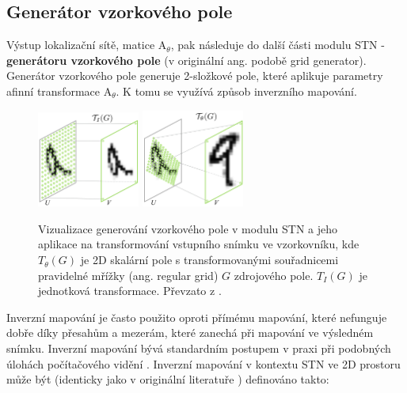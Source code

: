 \subsection{Generátor vzorkového pole}

Výstup lokalizační sítě, matice ${\displaystyle \mathrm {A} }_\theta$, pak následuje do další části modulu STN - \textbf{generátoru vzorkového pole} (v originální ang. podobě grid generator). Generátor vzorkového pole generuje 2-složkové pole, které aplikuje parametry afinní transformace ${\displaystyle \mathrm {A} }_\theta$. K tomu se využívá způsob inverzního mapování.

\begin{figure}[h]
\centering
\includegraphics[width=0.3\textwidth,keepaspectratio]{Figures/stn/stn_a.png}
\includegraphics[width=0.3\textwidth,keepaspectratio]{Figures/stn/stn_b.png}
\caption[Vizualizace generování vzorkového pole v modulu STN]
{Vizualizace generování vzorkového pole v modulu STN a jeho aplikace na transformování vstupního snímku ve vzorkovníku, kde $T_{\theta}(G)$ je 2D skalární pole s transformovanými souřadnicemi pravidelné mřížky (ang. regular grid) $G$ zdrojového pole. $T_{I}(G)$ je jednotková transformace. Převzato z \cite{stn}. }
\label{fig:stn_grid}
\end{figure}

Inverzní mapování je často použito oproti přímému mapování, které nefunguje dobře díky přesahům a mezerám, které zanechá při mapování ve výsledném snímku. Inverzní mapování bývá standardním postupem v praxi při podobných úlohách počítačového vidění \cite{stn_medium_1}. Inverzní mapování v kontextu STN ve 2D prostoru může být (identicky jako v originální literatuře \cite{stn}) definováno takto:

